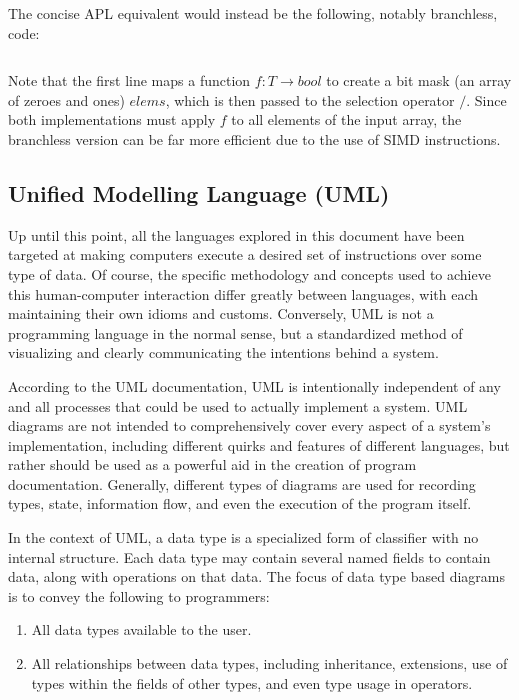 \documentclass{article}
\begin{document}
The concise APL equivalent would instead be the following, notably branchless, code:
\inputminted{apl}{linked_list/main.apl}
Note that the first line maps a function $f: T \rightarrow bool$ to create a bit mask
(an array of zeroes and ones) $elems$, which is then passed to the selection operator $/$.
Since both implementations must apply $f$ to all elements of the input array, the branchless version can
be far more efficient due to the use of SIMD instructions.

\subsection{Unified Modelling Language (UML)}

Up until this point, all the languages explored in this document have been targeted at making computers
execute a desired set of instructions over some type of data. Of course, the specific methodology
and concepts used to achieve this human-computer interaction differ greatly between languages,
with each maintaining their own idioms and customs. Conversely, UML is not a programming language in
the normal sense, but a standardized method of visualizing and clearly communicating the intentions behind a system.

According to the UML documentation, UML is intentionally independent of any and all processes that could be used
to actually implement a system. UML diagrams are not intended to comprehensively cover every aspect of a system's implementation,
including different quirks and features of different languages, but rather should be used as a powerful aid in
the creation of program documentation. Generally, different types of diagrams are used for recording types, state, information flow,
and even the execution of the program itself.

In the context of UML, a data type is a specialized form of classifier with no internal structure. Each data type may contain
several named fields to contain data, along with operations on that data.
The focus of data type based diagrams is to convey the following to programmers:
\begin{enumerate}
    \item All data types available to the user.
    \item All relationships between data types, including inheritance, extensions, use of types within the fields of other types,
    and even type usage in operators.
\end{enumerate}
\end{document}
